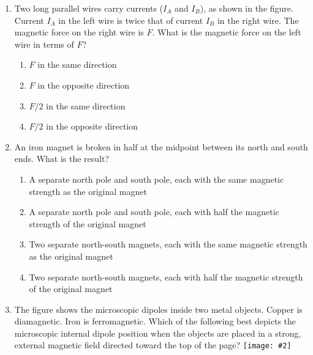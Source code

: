 \documentclass[11pt]{article}
\newcommand{\pic}[2]{\texttt{[image: \#2]}}
\begin{document}
\begin{multicols}{2}
\begin{enumerate}[leftmargin=18pt]
    \pic{.45}{screen1.png}

  \item Two long parallel wires carry currents ($I_A$ and $I_B$), as shown in
    the figure. Current $I_A$ in the left wire is twice that of current $I_B$
    in the right wire. The magnetic force on the right wire is $F$. What is the
    magnetic force on the left wire in terms of $F$?
    \begin{center}
    \end{center}
    \begin{enumerate}[noitemsep,topsep=0pt,leftmargin=18pt,label=(\Alph*)]
    \item $F$ in the same direction
    \item $F$ in the opposite direction
    \item $F/2$ in the same direction
    \item $F/2$ in the opposite direction
    \end{enumerate}


  \item An iron magnet is broken in half at the midpoint between its north
    and south ends. What is the result?
    \begin{enumerate}[noitemsep,topsep=0pt,leftmargin=18pt,label=(\Alph*)]
    \item A separate north pole and south pole, each with the same magnetic
      strength as the original magnet
    \item A separate north pole and south pole, each with half the magnetic
      strength of the original magnet
    \item Two separate north-south magnets, each with the same magnetic strength
      as the original magnet
    \item Two separate north-south magnets, each with half the magnetic strength
      of the original magnet
    \end{enumerate}

    \columnbreak

  \item The figure shows the microscopic dipoles inside two metal objects.
    Copper is diamagnetic. Iron is ferromagnetic. Which of the following best
    depicts the microscopic internal dipole position when the objects are
    placed in a strong, external magnetic field directed toward the top of the
    page?
    \pic{.45}{screen2.png}
  

\end{enumerate}
\end{multicols}
\end{document}
